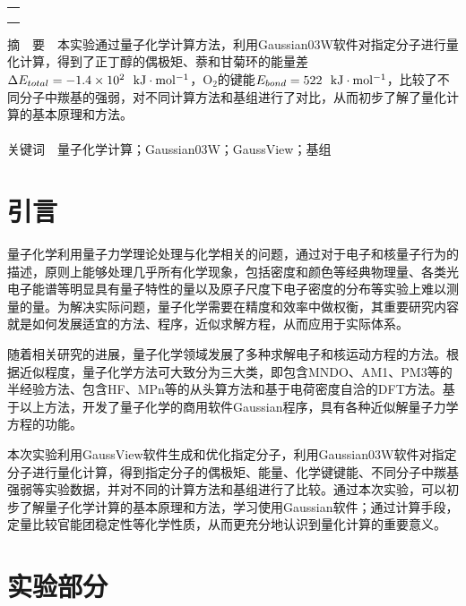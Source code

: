 \documentclass[12pt]{article}
\begin{document}
\begin{titlepage}
\begin{center}
            \begin{tabular*}{\textwidth}{c}
                \\ %
                \\ %
                \\ %
                \\ %
                \hline %
            \end{tabular*}
        \end{center}
        \textsf{摘\ \ 要}\ \ 本实验通过量子化学计算方法，利用Gaussian03W软件对指定分子进行量化计算，得到了正丁醇的偶极矩、萘和甘菊环的能量差$\Delta E_{total}=-1.4\times10^{2} \ \ {\rm kJ \cdot mol^{-1}} $，O$_{2}$的键能$E_{bond}=522\ \ {\rm kJ \cdot mol^{-1}}$，比较了不同分子中羰基的强弱，对不同计算方法和基组进行了对比，从而初步了解了量化计算的基本原理和方法。
        \\
        \\
        \textsf{关键词}\ \ 量子化学计算；Gaussian03W；GaussView；基组
    \end{titlepage}

    \section{引言}
	量子化学利用量子力学理论处理与化学相关的问题，通过对于电子和核量子行为的描述，原则上能够处理几乎所有化学现象，包括密度和颜色等经典物理量、各类光电子能谱等明显具有量子特性的量以及原子尺度下电子密度的分布等实验上难以测量的量。为解决实际问题，量子化学需要在精度和效率中做权衡，其重要研究内容就是如何发展适宜的方法、程序，近似求解方程，从而应用于实际体系。\par
	随着相关研究的进展，量子化学领域发展了多种求解电子和核运动方程的方法。根据近似程度，量子化学方法可大致分为三大类，即包含MNDO、AM1、PM3等的半经验方法、包含HF、MPn等的从头算方法和基于电荷密度自洽的DFT方法。基于以上方法，开发了量子化学的商用软件Gaussian程序，具有各种近似解量子力学方程的功能。\par
	本次实验利用GaussView软件生成和优化指定分子，利用Gaussian03W软件对指定分子进行量化计算，得到指定分子的偶极矩、能量、化学键键能、不同分子中羰基强弱等实验数据，并对不同的计算方法和基组进行了比较。通过本次实验，可以初步了解量子化学计算的基本原理和方法，学习使用Gaussian软件；通过计算手段，定量比较官能团稳定性等化学性质，从而更充分地认识到量化计算的重要意义。
               
\vbox{}        
    \section{实验部分}
\end{document}
